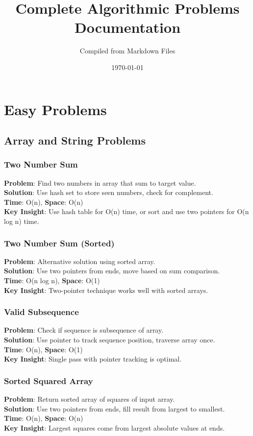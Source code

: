 \documentclass{report}
\title{Complete Algorithmic Problems Documentation}
\author{Compiled from Markdown Files}
\date{\today}
\begin{document}
\maketitle
\tableofcontents
\newpage

\chapter{Easy Problems}

\section{Array and String Problems}

\subsection{Two Number Sum}
\textbf{Problem}: Find two numbers in array that sum to target value.\\
\textbf{Solution}: Use hash set to store seen numbers, check for complement.\\
\textbf{Time}: O(n), \textbf{Space}: O(n)\\
\textbf{Key Insight}: Use hash table for O(n) time, or sort and use two pointers for O(n log n) time.

\subsection{Two Number Sum (Sorted)}
\textbf{Problem}: Alternative solution using sorted array.\\
\textbf{Solution}: Use two pointers from ends, move based on sum comparison.\\
\textbf{Time}: O(n log n), \textbf{Space}: O(1)\\
\textbf{Key Insight}: Two-pointer technique works well with sorted arrays.

\subsection{Valid Subsequence}
\textbf{Problem}: Check if sequence is subsequence of array.\\
\textbf{Solution}: Use pointer to track sequence position, traverse array once.\\
\textbf{Time}: O(n), \textbf{Space}: O(1)\\
\textbf{Key Insight}: Single pass with pointer tracking is optimal.

\subsection{Sorted Squared Array}
\textbf{Problem}: Return sorted array of squares of input array.\\
\textbf{Solution}: Use two pointers from ends, fill result from largest to smallest.\\
\textbf{Time}: O(n), \textbf{Space}: O(n)\\
\textbf{Key Insight}: Largest squares come from largest absolute values at ends.
\end{document}
